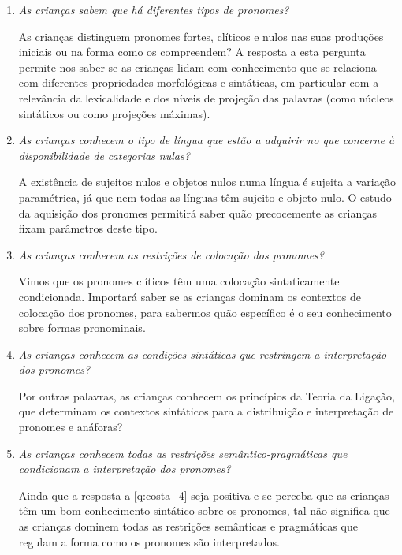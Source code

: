 \documentclass[output=paper]{LSP/langsci}
\begin{document}
\begin{enumerate}[label=Q\arabic*]
\item\label{q:costa_1}  \textit{As crianças sabem que há diferentes tipos de pronomes?}

As crianças distinguem pronomes fortes, clíticos e nulos nas suas produções iniciais ou na forma como os compreendem? A resposta a esta pergunta permite-nos saber se as crianças lidam com conhecimento que se relaciona com diferentes propriedades morfológicas e sintáticas, em particular com a relevância da lexicalidade e dos níveis de projeção das palavras (como núcleos sintáticos ou como projeções máximas).

\item\label{q:costa_2} \textit{As crianças conhecem o tipo de língua que estão a adquirir no que concerne à disponibilidade de categorias nulas?}

A existência de sujeitos nulos e objetos nulos numa língua é sujeita a variação paramétrica, já que nem todas as línguas têm sujeito e objeto nulo. O estudo da aquisição dos pronomes permitirá saber quão precocemente as crianças fixam parâmetros deste tipo.

\item\label{q:costa_3} \textit{As crianças conhecem as restrições de colocação dos pronomes?}

Vimos que os pronomes clíticos têm uma colocação sintaticamente condicionada. Importará saber se as crianças dominam os contextos de colocação dos pronomes, para sabermos quão específico é o seu conhecimento sobre formas pronominais.

\item\label{q:costa_4} \textit{As crianças conhecem as condições sintáticas que restringem a interpretação dos pronomes?}

Por outras palavras, as crianças conhecem os princípios da Teoria da Ligação, que determinam os contextos sintáticos para a distribuição e interpretação de pronomes e anáforas?

\item\label{q:costa_5} \textit{As crianças conhecem todas as restrições semântico-pragmáticas que condicionam a interpretação dos pronomes?}

Ainda que a resposta a \ref{q:costa_4} seja positiva e se perceba que as crianças têm um bom conhecimento sintático sobre os pronomes, tal não significa que as crianças dominem todas as restrições semânticas e pragmáticas que regulam a forma como os pronomes são interpretados.
\end{enumerate}
\end{document}
